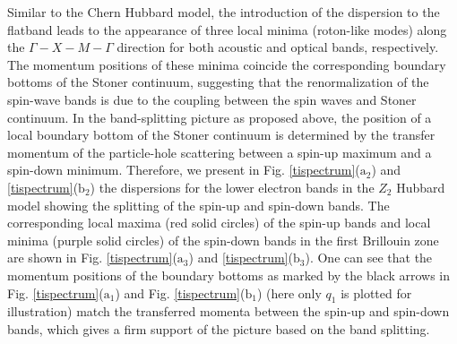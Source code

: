 \documentclass[amsmath,superscriptaddress,showpacs,aps,prb,twocolumn]{revtex4-1}
\begin{document}
\par Similar to the Chern Hubbard model, the introduction of the dispersion to the flatband leads to the appearance of three local minima (roton-like modes) along the $\Gamma-X-M-\Gamma$ direction for both acoustic and optical bands, respectively. The momentum positions of these minima coincide the corresponding boundary bottoms of the Stoner continuum, suggesting that the renormalization of the spin-wave bands is due to the coupling between the spin waves and Stoner continuum. In the band-splitting picture as proposed above, the position of a local boundary bottom of the Stoner continuum is determined by the transfer momentum of the particle-hole scattering between a spin-up maximum and a spin-down minimum. Therefore, we present in Fig. \ref{tispectrum}($\text{a}_2$) and \ref{tispectrum}($\text{b}_2$) the dispersions for the lower electron bands in the $Z_2$ Hubbard model showing the splitting of the spin-up and spin-down bands. The corresponding local maxima (red solid circles) of the spin-up bands and local minima (purple solid circles) of the spin-down bands in the first Brillouin zone are shown in Fig. \ref{tispectrum}($\text{a}_3$) and \ref{tispectrum}($\text{b}_3$). One can see that the momentum positions of the boundary bottoms as marked by the black arrows in Fig. \ref{tispectrum}($\text{a}_1$) and Fig. \ref{tispectrum}($\text{b}_1$) (here only $q_1$ is plotted for illustration) match the transferred momenta between the spin-up and spin-down bands, which gives a firm support of the picture based on the band splitting.
\end{document}
